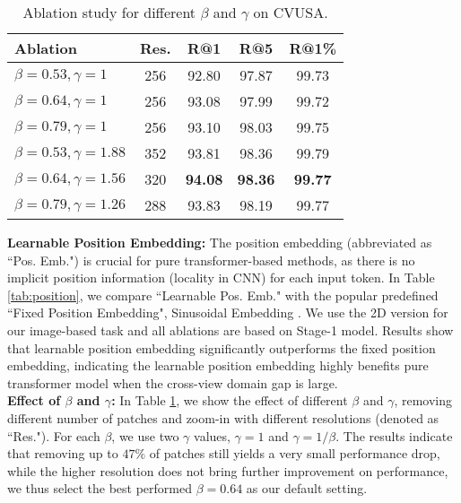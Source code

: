 \documentclass[10pt,twocolumn,letterpaper]{article}
\begin{document}
\begin{table}[!htbp]
    \centering
    \begin{tabular}{l c c c c} 
    \hline
    
    \hline
    Ablation & Res. & R@1 & R@5 & R@1\% \\
    \hline
        $\beta=0.53, \gamma=1$ & 256 & 92.80 & 97.87 & 99.73\\
        $\beta = 0.64, \gamma=1$ & 256 & 93.08 & 97.99  & 99.72  \\
        $\beta = 0.79, \gamma=1$ & 256 & 93.10 & 98.03& 99.75 \\
        \hline
        $\beta=0.53, \gamma=1.88$ & 352 & 93.81 & 98.36 & 99.79 \\
        $\beta = 0.64, \gamma=1.56$ & 320 & \textbf{94.08} & \textbf{98.36}  & \textbf{99.77} \\
        $\beta=0.79, \gamma=1.26$ & 288 & 93.83 & 98.19 & 99.77 \\
    \hline
    
    \hline
    \end{tabular}
\caption{Ablation study for different $\beta$ and $\gamma$ on CVUSA.}
    \label{tab:beta}
    \vspace{-0.2cm}
\end{table}

\noindent\textbf{Learnable Position Embedding:} The position embedding (abbreviated as ``Pos. Emb.") is crucial for pure transformer-based methods, as there is no implicit position information (\eg locality in CNN) for each input token. In Table \ref{tab:position}, we compare ``Learnable Pos. Emb." with the popular predefined ``Fixed Position Embedding", \ie Sinusoidal Embedding \cite{transformer}. We use the 2D version \cite{vit} for our image-based task and all ablations are based on Stage-1 model. Results show that learnable position embedding significantly outperforms the fixed position embedding, indicating the learnable position embedding highly benefits pure transformer model when the cross-view domain gap is large. \\
\noindent\textbf{Effect of $\beta$ and $\gamma$:} In Table \ref{tab:beta}, we show the effect of different $\beta$ and $\gamma$, removing different number of patches and zoom-in with different resolutions (denoted as ``Res."). For each $\beta$, we use two $\gamma$ values, \ie $\gamma=1$ and $\gamma=1/\beta$. The results indicate that removing up to $47 \%$ of patches still yields a very small performance drop, while the higher resolution does not bring further improvement on performance, we thus select the best performed $\beta=0.64$ as our default setting.\\
\end{document}
